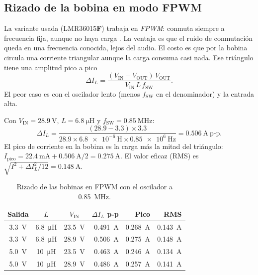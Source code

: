 \subsection{Rizado de la bobina en modo FPWM}

La variante usada (LMR36015\textbf{F}) trabaja en \emph{FPWM}: conmuta siempre a frecuencia fija, aunque no haya
carga . La ventaja es que el ruido de conmutación queda en una frecuencia conocida, lejos del
audio. El costo es que por la bobina circula una corriente triangular aunque la carga consuma casi nada. Ese
triángulo tiene una amplitud pico a pico
\begin{equation}\label{eq:c10-ripple}
\Delta I_L = \frac{(V_\text{IN} - V_\text{OUT})\,V_\text{OUT}}{V_\text{IN}\, L\, f_\text{SW}}.
\end{equation}
El peor caso es con el oscilador lento (menos $f_\text{SW}$ en el denominador) y la entrada alta.

\begin{calculo}
Con $V_\text{IN} = \SI{28.9}{\volt}$, $L = \SI{6.8}{\micro\henry}$ y $f_\text{SW} = \SI{0.85}{\mega\hertz}$:
\begin{equation}
\Delta I_L = \frac{(\num{28.9} - \num{3.3})\times \num{3.3}}{\num{28.9}\times \SI{6.8e-6}{\henry}\times\SI{0.85e6}{\hertz}}
 = \SI{0.506}{\ampere}\ \text{p-p}.
\end{equation}
El pico de corriente en la bobina es la carga más la mitad del triángulo:
$I_\text{pico} = \SI{22.4}{\milli\ampere} + \SI{0.506}{\ampere}/2 = \SI{0.275}{\ampere}$.
El valor eficaz (RMS) es $\sqrt{I^2 + \Delta I_L^2/12} = \SI{0.148}{\ampere}$.
\end{calculo}

\begin{table}[htbp]
\centering
\caption{Rizado de las bobinas en FPWM con el oscilador a \SI{0.85}{\mega\hertz}.}\label{tab:c10-ripple}
\small
\begin{tabular}{@{}cccrrr@{}}
\toprule
Salida & $L$ & $V_\text{IN}$ & $\Delta I_L$ p-p & Pico & RMS\\\midrule
\SI{3.3}{\volt} & \SI{6.8}{\micro\henry} & \SI{23.5}{\volt} & \SI{0.491}{\ampere} & \SI{0.268}{\ampere} & \SI{0.143}{\ampere}\\
\SI{3.3}{\volt} & \SI{6.8}{\micro\henry} & \SI{28.9}{\volt} & \SI{0.506}{\ampere} & \SI{0.275}{\ampere} & \SI{0.148}{\ampere}\\
\SI{5.0}{\volt} & \SI{10}{\micro\henry} & \SI{23.5}{\volt} & \SI{0.463}{\ampere} & \SI{0.246}{\ampere} & \SI{0.134}{\ampere}\\
\SI{5.0}{\volt} & \SI{10}{\micro\henry} & \SI{28.9}{\volt} & \SI{0.486}{\ampere} & \SI{0.257}{\ampere} & \SI{0.141}{\ampere}\\
\bottomrule
\end{tabular}
\end{table}

